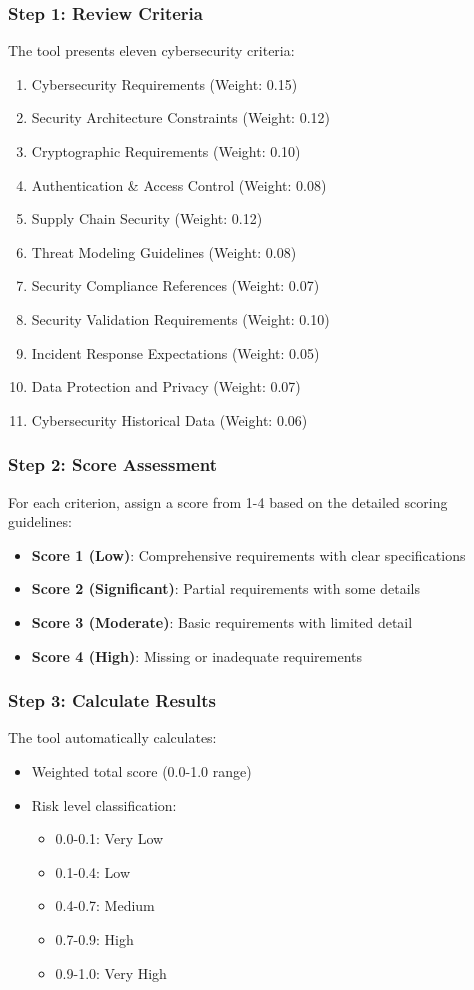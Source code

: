 \documentclass[binding=0.6cm]{sapthesis}
\begin{document}
\subsubsection{Step 1: Review Criteria}
The tool presents eleven cybersecurity criteria:
\begin{enumerate}
    \item Cybersecurity Requirements (Weight: 0.15)
    \item Security Architecture Constraints (Weight: 0.12)
    \item Cryptographic Requirements (Weight: 0.10)
    \item Authentication \& Access Control (Weight: 0.08)
    \item Supply Chain Security (Weight: 0.12)
    \item Threat Modeling Guidelines (Weight: 0.08)
    \item Security Compliance References (Weight: 0.07)
    \item Security Validation Requirements (Weight: 0.10)
    \item Incident Response Expectations (Weight: 0.05)
    \item Data Protection and Privacy (Weight: 0.07)
    \item Cybersecurity Historical Data (Weight: 0.06)
\end{enumerate}

\subsubsection{Step 2: Score Assessment}
For each criterion, assign a score from 1-4 based on the detailed scoring guidelines:
\begin{itemize}
    \item \textbf{Score 1 (Low)}: Comprehensive requirements with clear specifications
    \item \textbf{Score 2 (Significant)}: Partial requirements with some details
    \item \textbf{Score 3 (Moderate)}: Basic requirements with limited detail
    \item \textbf{Score 4 (High)}: Missing or inadequate requirements
\end{itemize}

\subsubsection{Step 3: Calculate Results}
The tool automatically calculates:
\begin{itemize}
    \item Weighted total score (0.0-1.0 range)
    \item Risk level classification:
    \begin{itemize}
        \item 0.0-0.1: Very Low
        \item 0.1-0.4: Low
        \item 0.4-0.7: Medium
        \item 0.7-0.9: High
        \item 0.9-1.0: Very High
    \end{itemize}
\end{itemize}
\end{document}
